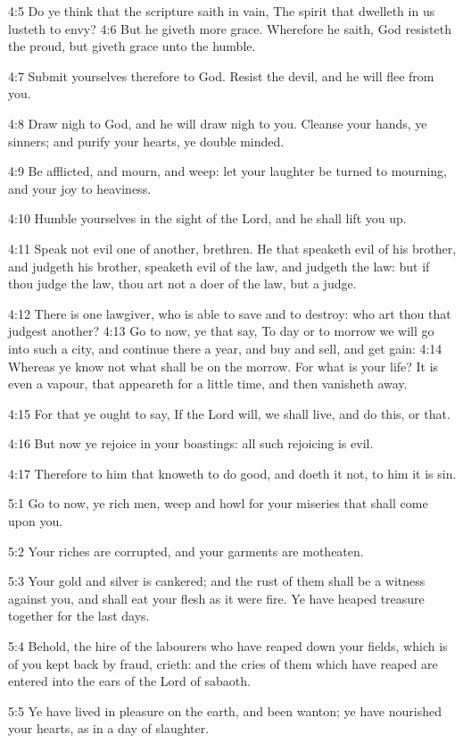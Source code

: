 4:5 Do ye think that the scripture saith in vain, The spirit that
dwelleth in us lusteth to envy?  4:6 But he giveth more grace.
Wherefore he saith, God resisteth the proud, but giveth grace unto the
humble.

4:7 Submit yourselves therefore to God. Resist the devil, and he will
flee from you.

4:8 Draw nigh to God, and he will draw nigh to you. Cleanse your
hands, ye sinners; and purify your hearts, ye double minded.

4:9 Be afflicted, and mourn, and weep: let your laughter be turned to
mourning, and your joy to heaviness.

4:10 Humble yourselves in the sight of the Lord, and he shall lift you
up.

4:11 Speak not evil one of another, brethren. He that speaketh evil of
his brother, and judgeth his brother, speaketh evil of the law, and
judgeth the law: but if thou judge the law, thou art not a doer of the
law, but a judge.

4:12 There is one lawgiver, who is able to save and to destroy: who
art thou that judgest another?  4:13 Go to now, ye that say, To day or
to morrow we will go into such a city, and continue there a year, and
buy and sell, and get gain: 4:14 Whereas ye know not what shall be on
the morrow. For what is your life? It is even a vapour, that appeareth
for a little time, and then vanisheth away.

4:15 For that ye ought to say, If the Lord will, we shall live, and do
this, or that.

4:16 But now ye rejoice in your boastings: all such rejoicing is evil.

4:17 Therefore to him that knoweth to do good, and doeth it not, to
him it is sin.

5:1 Go to now, ye rich men, weep and howl for your miseries that shall
come upon you.

5:2 Your riches are corrupted, and your garments are motheaten.

5:3 Your gold and silver is cankered; and the rust of them shall be a
witness against you, and shall eat your flesh as it were fire. Ye have
heaped treasure together for the last days.

5:4 Behold, the hire of the labourers who have reaped down your
fields, which is of you kept back by fraud, crieth: and the cries of
them which have reaped are entered into the ears of the Lord of
sabaoth.

5:5 Ye have lived in pleasure on the earth, and been wanton; ye have
nourished your hearts, as in a day of slaughter.

